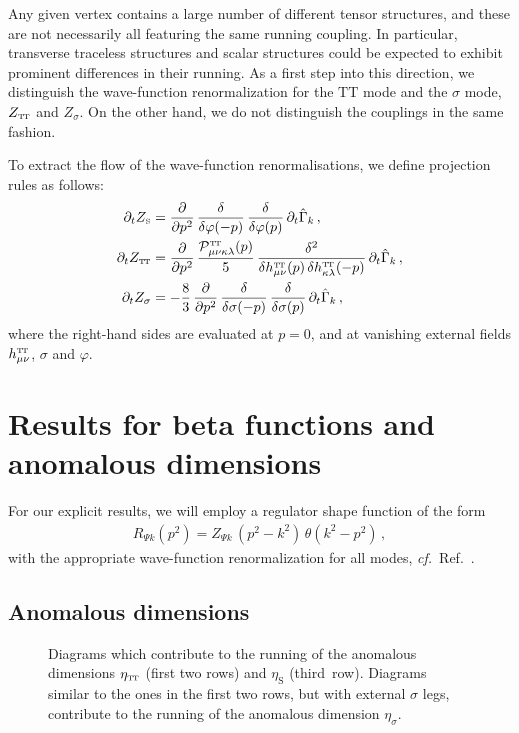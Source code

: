 \documentclass[11pt]{book}
\newcommand\TTspace{ -1pt }
\newcommand\TT{ \scriptscriptstyle{\mathrm{T\hspace{\TTspace}T}} }
\newcommand\hTTmunu{ h^{\scriptscriptstyle{\mathrm{T\hspace{\TTspace}T}}}_{\mu\nu} }
\newcommand\etaTT{ \eta_{\scriptscriptstyle{\mathrm{T\hspace{\TTspace}T}}} }
\newcommand\ZTT{ Z_{\scriptscriptstyle{\mathrm{T\hspace{\TTspace}T}}} }
\newcommand\etaS{ \eta_{\scriptscriptstyle{\mathrm{S}}} }
\newcommand\ZS{ Z_{\scriptscriptstyle{\mathrm{S}}} }
\newcommand\cf{\textit{cf.}\ }
\numberwithin{equation}{chapter}
\begin{document}
Any given vertex contains a large number of different tensor structures,
and these are not necessarily all featuring the same running coupling.
In particular, transverse traceless structures and scalar structures could be expected to exhibit
prominent differences in their running. As a first step into this direction,
we distinguish the wave-function renormalization for the $\mathrm{TT}$ mode and the $\sigma$ mode,
$\ZTT$ and $Z_{\sigma}$. On the other hand, we do not distinguish the couplings in the same fashion.

To extract the flow of the wave-function renormalisations, we define projection rules as follows:
\begin{align}
  \partial_t \ZS &=
  \frac{\partial}{\partial p^2} \, \frac{\delta}{\delta \varphi(-p)} \, \frac{\delta}{\delta \varphi(p)} \, \partial_t \hat \Gamma_k \,, \\
  \partial_t \ZTT &=
  \frac{\partial}{\partial p^2}  \, \frac{\mathcal P^{\TT}_{\mu \nu\kappa\lambda}(p)}{5}
  \, \frac{\delta^2}{\delta \hTTmunu (p) \, \delta h^{\TT}_{\kappa \lambda}(-p)} \, \partial_t \hat \Gamma_k
  \label{eq:projectZTT}\,, \\
  \partial_t Z_{\sigma} &= -\frac{8}{3} \,
  \frac{\partial}{\partial p^2} \, \frac{\delta}{\delta \sigma(-p)} \, \frac{\delta}{\delta \sigma(p)} \, \partial_t \hat \Gamma_k \,,
\end{align}
where the right-hand sides are evaluated at $p=0$,
and at vanishing external fields $\hTTmunu$, $\sigma$ and $\varphi$.


\section{Results for beta functions and anomalous dimensions}
\label{sec:resultsCH4}

For our explicit results, we will employ a regulator shape function of the form
\begin{align}
  \nonumber
  R_{\Psi k} \left( p^2\right) = Z_{\Psi k} \, (p^2-k^2) \, \theta(k^2-p^2) \,,
\end{align}
with the appropriate wave-function renormalization for all modes, \cf Ref.~\cite{Litim:2001up}.


\subsection{Anomalous dimensions}

\begin{figure}[p]
  \begin{center}
    
  \end{center}
  \caption{
    Diagrams which contribute to the running of the anomalous dimensions
    $\etaTT$ (first two rows) and $\etaS$ (third~row).
    Diagrams similar to the ones in the first two rows, but with external $\sigma$ legs,
    contribute to the running of the anomalous dimension $\eta_{\sigma}$.
  }
  \label{fig:eta-diagrams-ch4}
\end{figure}
\end{document}
